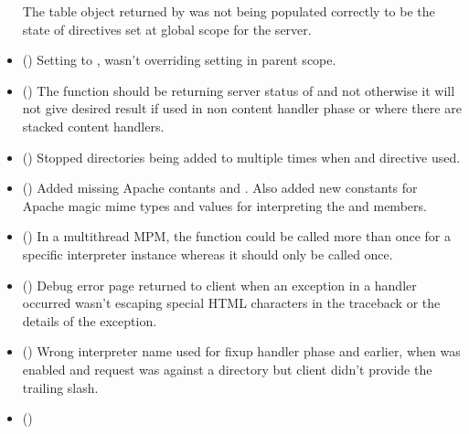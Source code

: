 \begin{itemize}
      The table object returned by  was not
      being populated correctly to be the state of directives set at global
      scope for the server.
    \item
      ()
      Setting  to , wasn't overriding 
      setting in parent scope.
    \item
      ()
      The  function should be returning server status of
       and not  otherwise it will not give
      desired result if used in non content handler phase or where there are
      stacked content handlers.
    \item
      ()
      Stopped directories being added to  multiple times when
       and  directive used.
    \item
      ()
      Added missing Apache contants  and
      . Also added new constants for
      Apache magic mime types and values for interpreting the
       and  members.
    \item
      ()
      In a multithread MPM, the  function could be called
      more than once for a specific interpreter instance whereas it should
      only be called once.
    \item
      ()
      Debug error page returned to client when an exception in a handler
      occurred wasn't escaping special HTML characters in the traceback or
      the details of the exception.
    \item
      ()
      Wrong interpreter name used for fixup handler phase and earlier, when
       was enabled and request was against
      a directory but client didn't provide the trailing slash.
    \item
      ()

\end{itemize}
